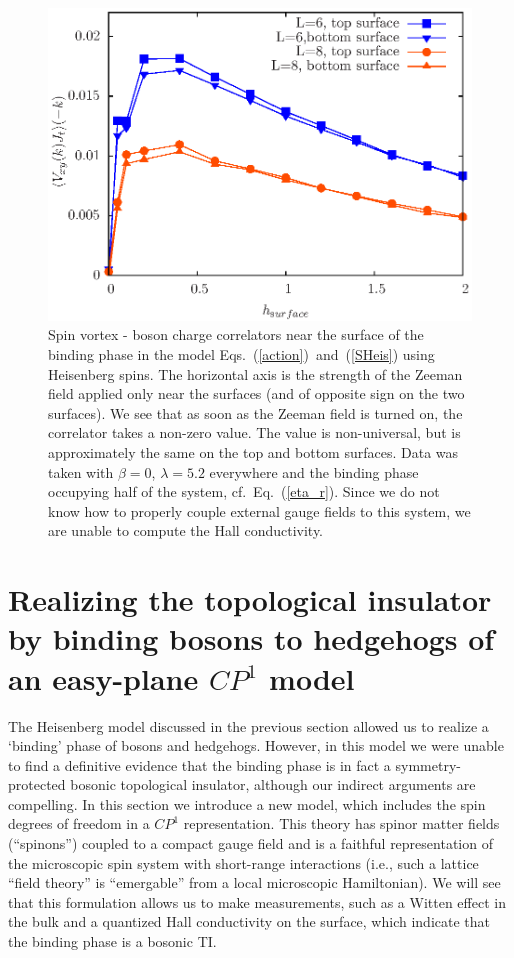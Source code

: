 \documentclass[prb,twocolumn]{revtex4-1}
\newcommand{\cp}{$CP^1$ }
\begin{document}
\begin{figure}
\includegraphics[width=\linewidth]{figures/vortexcor.eps}
\caption{Spin vortex - boson charge correlators near the surface of the binding phase in the model Eqs.~(\ref{action})~and~(\ref{SHeis}) using Heisenberg spins. The horizontal axis is the strength of the Zeeman field applied only near the surfaces (and of opposite sign on the two surfaces). We see that as soon as the Zeeman field is turned on, the correlator takes a non-zero value. The value is non-universal, but is approximately the same on the top and bottom surfaces. Data was taken with $\beta=0$, $\lambda=5.2$ everywhere and the binding phase occupying half of the system, cf.\ Eq.~(\ref{eta_r}).  Since we do not know how to properly couple external gauge fields to this system, we are unable to compute the Hall conductivity.
}
\label{heishall}
\end{figure}




\section{Realizing the topological insulator by binding bosons to hedgehogs of an easy-plane \cp model}
\label{section::CP1}

The Heisenberg model discussed in the previous section allowed us to realize a `binding' phase of bosons and hedgehogs. However, in this model we were unable to find a definitive evidence that the binding phase is in fact a symmetry-protected bosonic topological insulator, although our indirect arguments are compelling. In this section we introduce a new model, which includes the spin degrees of freedom in a \cp representation. 
This theory has spinor matter fields (``spinons'') coupled to a compact gauge field and is a faithful representation of the microscopic spin system with short-range interactions (i.e., such a lattice ``field theory'' is ``emergable'' from a local microscopic Hamiltonian). We will see that this formulation allows us to make measurements, such as a Witten effect in the bulk and a quantized Hall conductivity on the surface, which indicate that the binding phase is a bosonic TI.
\end{document}
